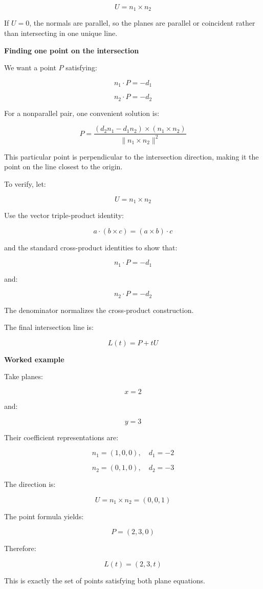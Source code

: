 \[
\boxed{ U=n_1\times n_2 }
\]

If \(U=0\), the normals are parallel, so the planes are parallel or coincident rather than intersecting in one unique line.

\textbf{Finding one point on the intersection}

We want a point \(P\) satisfying:

\[
n_1\cdot P=-d_1
\]

\[
n_2\cdot P=-d_2
\]

For a nonparallel pair, one convenient solution is:

\[
\boxed{ P= \frac{ (d_2n_1-d_1n_2)\times(n_1\times n_2) }{ \|n_1\times n_2\|^2 } }
\]

This particular point is perpendicular to the intersection direction, making it the point on the line closest to the origin.

To verify, let:

\[
U=n_1\times n_2
\]

Use the vector triple-product identity:

\[
a\cdot(b\times c)=(a\times b)\cdot c
\]

and the standard cross-product identities to show that:

\[
n_1\cdot P=-d_1
\]

and:

\[
n_2\cdot P=-d_2
\]

The denominator normalizes the cross-product construction.

The final intersection line is:

\[
\boxed{ L(t)=P+tU }
\]

\textbf{Worked example}

Take planes:

\[
x=2
\]

and:

\[
y=3
\]

Their coefficient representations are:

\[
n_1=(1,0,0),\quad d_1=-2
\]

\[
n_2=(0,1,0),\quad d_2=-3
\]

The direction is:

\[
U=n_1\times n_2=(0,0,1)
\]

The point formula yields:

\[
P=(2,3,0)
\]

Therefore:

\[
\boxed{ L(t)=(2,3,t) }
\]

This is exactly the set of points satisfying both plane equations.

